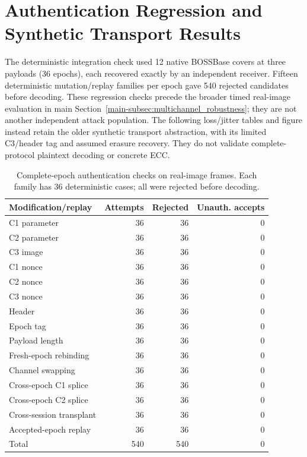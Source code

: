 \documentclass[journal]{IEEEtran}
\theoremstyle{definition}
\theoremstyle{game}
\begin{document}
\section{Authentication Regression and Synthetic Transport Results}
\label{sec:legacy-transport}
The deterministic integration check used 12 native BOSSBase covers at
three payloads (36 epochs), each recovered exactly by an independent
receiver. Fifteen deterministic mutation/replay families per epoch gave
540 rejected candidates before decoding. These regression checks precede
the broader timed real-image evaluation in main
Section~\ref{main-subsec:multichannel_robustness}; they are not another
independent attack population. The following loss/jitter tables and
figure instead retain the older synthetic transport abstraction, with
its limited C3/header tag and assumed erasure recovery. They do not
validate complete-protocol plaintext decoding or concrete ECC.

\begin{table}[H]
\centering\scriptsize
\caption{Complete-epoch authentication checks on real-image frames.
Each family has 36 deterministic cases; all were rejected before decoding.}
\label{tab:qim_resync_active_interference}
\begin{tabular}{@{}lrrr@{}}
\toprule
Modification/replay & Attempts & Rejected & Unauth. accepts\\
\midrule
C1 parameter & 36 & 36 & 0 \\
C2 parameter & 36 & 36 & 0 \\
C3 image & 36 & 36 & 0 \\
C1 nonce & 36 & 36 & 0 \\
C2 nonce & 36 & 36 & 0 \\
C3 nonce & 36 & 36 & 0 \\
Header & 36 & 36 & 0 \\
Epoch tag & 36 & 36 & 0 \\
Payload length & 36 & 36 & 0 \\
Fresh-epoch rebinding & 36 & 36 & 0 \\
Channel swapping & 36 & 36 & 0 \\
Cross-epoch C1 splice & 36 & 36 & 0 \\
Cross-epoch C2 splice & 36 & 36 & 0 \\
Cross-session transplant & 36 & 36 & 0 \\
Accepted-epoch replay & 36 & 36 & 0 \\
\midrule
Total & 540 & 540 & 0\\
\bottomrule
\end{tabular}
\end{table}
\end{document}

